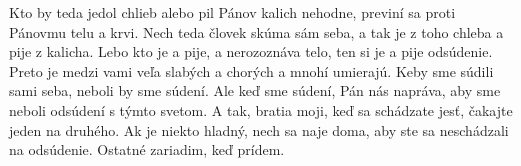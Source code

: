 Kto by teda jedol chlieb alebo pil Pánov kalich nehodne, previní sa proti Pánovmu telu a krvi. 
Nech teda človek skúma sám seba, a tak je z toho chleba a pije z kalicha.
Lebo kto je a pije, a nerozoznáva telo, ten si je a pije odsúdenie.
Preto je medzi vami veľa slabých a chorých a mnohí umierajú. 
Keby sme súdili sami seba, neboli by sme súdení.
Ale keď sme súdení, Pán nás napráva, aby sme neboli odsúdení s týmto svetom.
A tak, bratia moji, keď sa schádzate jesť, čakajte jeden na druhého.
Ak je niekto hladný, nech sa naje doma, aby ste sa neschádzali na odsúdenie. Ostatné zariadim, keď prídem. 